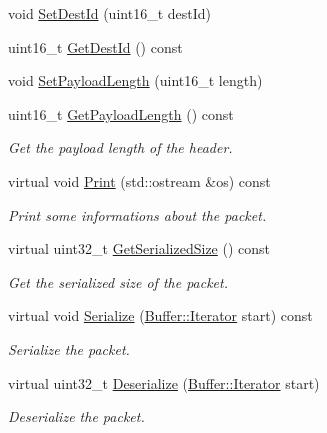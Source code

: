 \begin{DoxyCompactItemize}
\item 
void \hyperlink{classns3_1_1dsr_1_1DsrFsHeader_a366ce2a526714d7d5c1b030c93cfce2b}{Set\+Dest\+Id} (uint16\+\_\+t dest\+Id)
\item 
uint16\+\_\+t \hyperlink{classns3_1_1dsr_1_1DsrFsHeader_ab7f416f0c7f37cc143d482e18712a91f}{Get\+Dest\+Id} () const 
\item 
void \hyperlink{classns3_1_1dsr_1_1DsrFsHeader_ad5d554d06faf5eb5b98d30a5eee9c87e}{Set\+Payload\+Length} (uint16\+\_\+t length)
\item 
uint16\+\_\+t \hyperlink{classns3_1_1dsr_1_1DsrFsHeader_a30db4a1349e5519f7cd31a9a06e7615c}{Get\+Payload\+Length} () const 
\begin{DoxyCompactList}\small\item\em Get the payload length of the header. \end{DoxyCompactList}\item 
virtual void \hyperlink{classns3_1_1dsr_1_1DsrFsHeader_a9f59477ffb45d9bfaa9a5e02c787d637}{Print} (std\+::ostream \&os) const 
\begin{DoxyCompactList}\small\item\em Print some informations about the packet. \end{DoxyCompactList}\item 
virtual uint32\+\_\+t \hyperlink{classns3_1_1dsr_1_1DsrFsHeader_aa5c994c244c7c82fead10ae7c0ef838d}{Get\+Serialized\+Size} () const 
\begin{DoxyCompactList}\small\item\em Get the serialized size of the packet. \end{DoxyCompactList}\item 
virtual void \hyperlink{classns3_1_1dsr_1_1DsrFsHeader_af8f508a2b05faac2b869d37fe672b911}{Serialize} (\hyperlink{classns3_1_1Buffer_1_1Iterator}{Buffer\+::\+Iterator} start) const 
\begin{DoxyCompactList}\small\item\em Serialize the packet. \end{DoxyCompactList}\item 
virtual uint32\+\_\+t \hyperlink{classns3_1_1dsr_1_1DsrFsHeader_acb5736dd005d323eefae5cc9db9eb5b9}{Deserialize} (\hyperlink{classns3_1_1Buffer_1_1Iterator}{Buffer\+::\+Iterator} start)
\begin{DoxyCompactList}\small\item\em Deserialize the packet. \end{DoxyCompactList}\end{DoxyCompactItemize}
